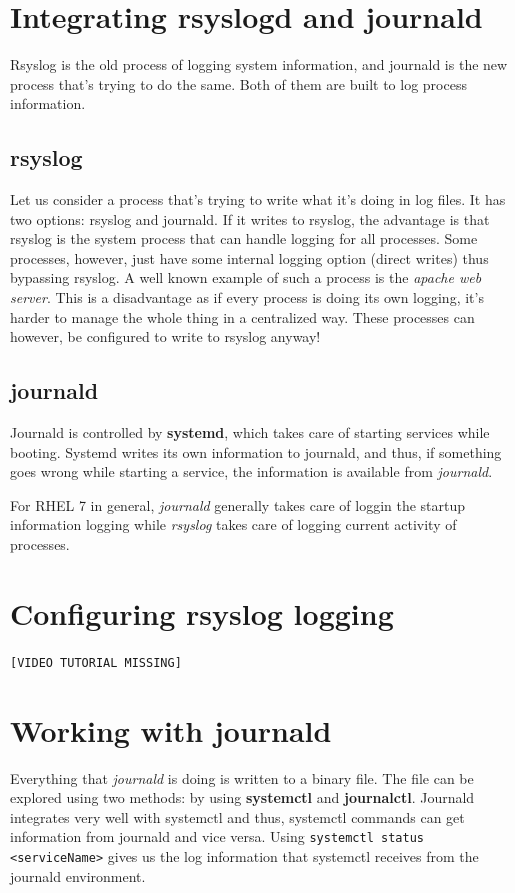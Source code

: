 	\section{Integrating rsyslogd and journald} 
Rsyslog is the old process of logging system information, and journald is the new process that's trying to do the same. Both of them are built to log process information.

\subsection{rsyslog}
Let us consider a process that's trying to write what it's doing in log files. It has two options: rsyslog and journald. If it writes to rsyslog, the advantage is that rsyslog is the system process that can handle logging for all processes. Some processes, however, just have some internal logging option (direct writes) thus bypassing rsyslog. A well known example of such a process is the \textit{apache web server}. This is a disadvantage as if every process is doing its own logging, it's harder to manage the whole thing in a centralized way. These processes can however, be configured to write to rsyslog anyway! 

\subsection{journald}
Journald is controlled by \textbf{systemd}, which takes care of starting services while booting. Systemd writes its own information to journald, and thus, if something goes wrong while starting a service, the information is available from \textit{journald}. 

For RHEL 7 in general, \textit{journald} generally takes care of loggin the startup information logging while \textit{rsyslog} takes care of logging current activity of processes.

\section{Configuring rsyslog logging}

\begin{center}
	\verb|[VIDEO TUTORIAL MISSING]|
\end{center}
\vspace{-20pt}

\section{Working with journald}
Everything that \textit{journald} is doing is written to a binary file. The file can be explored using two methods: by using \textbf{systemctl} and \textbf{journalctl}. Journald integrates very well with systemctl and thus, systemctl commands can get information from journald and vice versa. Using \verb|systemctl status <serviceName>| gives us the log information that systemctl receives from the journald environment. 

